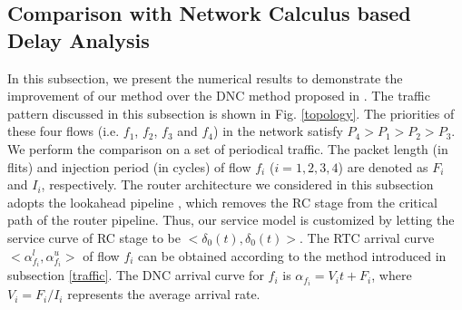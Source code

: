 \documentclass[preprint]{elsarticle}
\begin{document}
\subsection{Comparison with Network Calculus based Delay Analysis}\label{dnccmp}
In this subsection, we present the numerical results to demonstrate the improvement of our method over the DNC method proposed in \cite{Qian489900}. The traffic pattern discussed in this subsection is shown in Fig. \ref{topology}. The priorities of these four flows (i.e. $f_1$, $f_2$, $f_3$ and $f_4$) in the network satisfy $P_4>P_1>P_2>P_3$. We perform the comparison on a set of periodical traffic. The packet length (in flits) and injection period (in cycles) of flow $f_i$ ($i=1,2,3,4$) are denoted as $F_i$ and $I_i$, respectively. The router architecture we considered in this subsection adopts the lookahead pipeline \cite{jerger2009chip}, which removes the RC stage from the critical path of the router pipeline. Thus, our service model is customized by letting the service curve of RC stage to be $<\delta_0(t),\delta_0(t)>$. The RTC arrival curve $<\alpha_{f_i}^l,\alpha_{f_i}^u>$ of flow $f_i$ can be obtained according to the method introduced in subsection \ref{traffic}. The DNC arrival curve for $f_i$ is $\alpha_{f_i}=V_i t+F_i$, where $V_i=F_i/I_i$ represents the average arrival rate.
\end{document}
